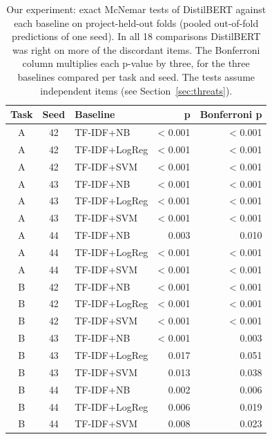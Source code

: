\documentclass[conference,10pt,letterpaper]{IEEEtran}
\begin{document}
\begin{table}[!t]
\centering
\caption{Our experiment: exact McNemar tests of DistilBERT against each baseline on project-held-out folds (pooled out-of-fold predictions of one seed). In all 18 comparisons DistilBERT was right on more of the discordant items. The Bonferroni column multiplies each p-value by three, for the three baselines compared per task and seed. The tests assume independent items (see Section~\ref{sec:threats}).}
\label{tab:mcn}
\scriptsize
\setlength{\tabcolsep}{3pt}
\renewcommand{\arraystretch}{1.12}
\begin{tabular}{@{}cclrr@{}}
\toprule
\textbf{Task} & \textbf{Seed} & \textbf{Baseline} & \textbf{p} & \textbf{Bonferroni p} \\
\midrule
A & 42 & TF-IDF+NB & \textless{} 0.001 & \textless{} 0.001 \\
A & 42 & TF-IDF+LogReg & \textless{} 0.001 & \textless{} 0.001 \\
A & 42 & TF-IDF+SVM & \textless{} 0.001 & \textless{} 0.001 \\
A & 43 & TF-IDF+NB & \textless{} 0.001 & \textless{} 0.001 \\
A & 43 & TF-IDF+LogReg & \textless{} 0.001 & \textless{} 0.001 \\
A & 43 & TF-IDF+SVM & \textless{} 0.001 & \textless{} 0.001 \\
A & 44 & TF-IDF+NB & 0.003 & 0.010 \\
A & 44 & TF-IDF+LogReg & \textless{} 0.001 & \textless{} 0.001 \\
A & 44 & TF-IDF+SVM & \textless{} 0.001 & \textless{} 0.001 \\
B & 42 & TF-IDF+NB & \textless{} 0.001 & \textless{} 0.001 \\
B & 42 & TF-IDF+LogReg & \textless{} 0.001 & \textless{} 0.001 \\
B & 42 & TF-IDF+SVM & \textless{} 0.001 & \textless{} 0.001 \\
B & 43 & TF-IDF+NB & \textless{} 0.001 & 0.003 \\
B & 43 & TF-IDF+LogReg & 0.017 & 0.051 \\
B & 43 & TF-IDF+SVM & 0.013 & 0.038 \\
B & 44 & TF-IDF+NB & 0.002 & 0.006 \\
B & 44 & TF-IDF+LogReg & 0.006 & 0.019 \\
B & 44 & TF-IDF+SVM & 0.008 & 0.023 \\
\bottomrule
\end{tabular}
\end{table}
\end{document}
